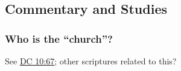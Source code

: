 

	
		
	
	
	
	
\subsection{Commentary and Studies} %
	\label{CHURCH-COMMENTARY}

	
		
	\subsubsection{Who is the ``church''?}
		\label{CHURCH-who}
		
		See \hyperref[DC10-67]{DC 10:67}; other scriptures related to this?
